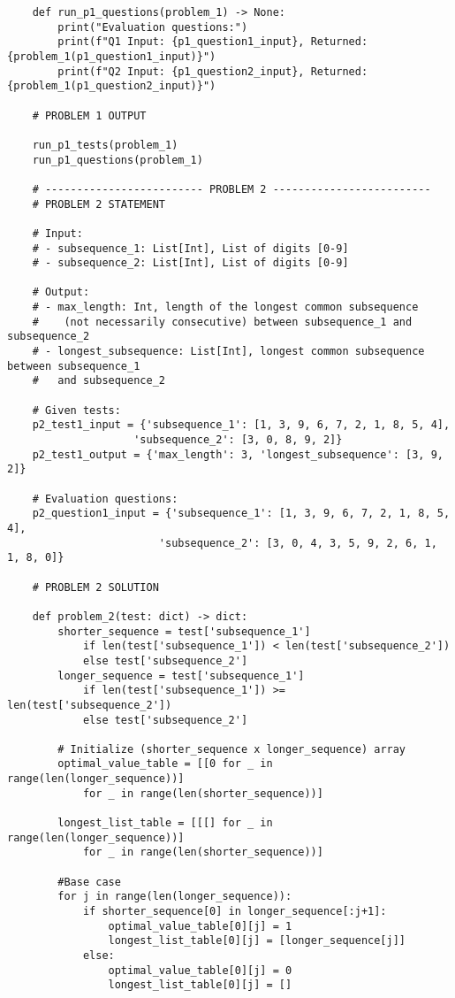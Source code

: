 \documentclass[12pt]{article}
\begin{document}
\begin{verbatim}
    def run_p1_questions(problem_1) -> None:
        print("Evaluation questions:")
        print(f"Q1 Input: {p1_question1_input}, Returned: {problem_1(p1_question1_input)}")
        print(f"Q2 Input: {p1_question2_input}, Returned: {problem_1(p1_question2_input)}")

    # PROBLEM 1 OUTPUT

    run_p1_tests(problem_1) 
    run_p1_questions(problem_1)

    # ------------------------- PROBLEM 2 -------------------------
    # PROBLEM 2 STATEMENT

    # Input:
    # - subsequence_1: List[Int], List of digits [0-9] 
    # - subsequence_2: List[Int], List of digits [0-9]

    # Output: 
    # - max_length: Int, length of the longest common subsequence 
    #    (not necessarily consecutive) between subsequence_1 and subsequence_2
    # - longest_subsequence: List[Int], longest common subsequence between subsequence_1
    #   and subsequence_2

    # Given tests:
    p2_test1_input = {'subsequence_1': [1, 3, 9, 6, 7, 2, 1, 8, 5, 4],
                    'subsequence_2': [3, 0, 8, 9, 2]}
    p2_test1_output = {'max_length': 3, 'longest_subsequence': [3, 9, 2]}

    # Evaluation questions: 
    p2_question1_input = {'subsequence_1': [1, 3, 9, 6, 7, 2, 1, 8, 5, 4],
                        'subsequence_2': [3, 0, 4, 3, 5, 9, 2, 6, 1, 1, 8, 0]}

    # PROBLEM 2 SOLUTION

    def problem_2(test: dict) -> dict:
        shorter_sequence = test['subsequence_1'] 
            if len(test['subsequence_1']) < len(test['subsequence_2']) 
            else test['subsequence_2']
        longer_sequence = test['subsequence_1'] 
            if len(test['subsequence_1']) >= len(test['subsequence_2']) 
            else test['subsequence_2']

        # Initialize (shorter_sequence x longer_sequence) array
        optimal_value_table = [[0 for _ in range(len(longer_sequence))] 
            for _ in range(len(shorter_sequence))]
        
        longest_list_table = [[[] for _ in range(len(longer_sequence))] 
            for _ in range(len(shorter_sequence))]

        #Base case
        for j in range(len(longer_sequence)):
            if shorter_sequence[0] in longer_sequence[:j+1]:
                optimal_value_table[0][j] = 1
                longest_list_table[0][j] = [longer_sequence[j]]
            else:
                optimal_value_table[0][j] = 0
                longest_list_table[0][j] = []


\end{verbatim}
\end{document}
